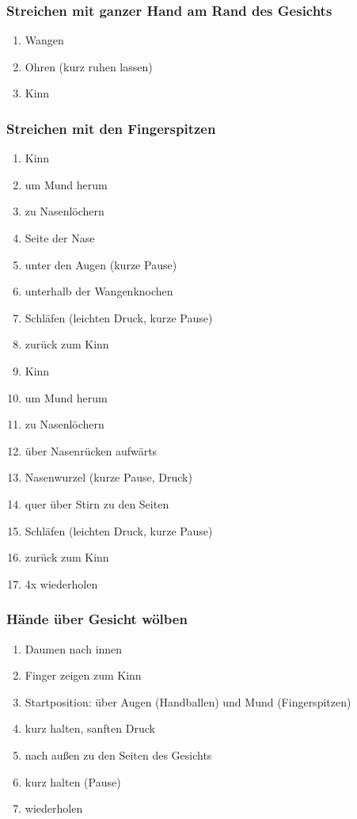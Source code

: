 \subsubsection{Streichen mit ganzer Hand am Rand des Gesichts}
\begin{enumerate}
\item Wangen
\item Ohren (kurz ruhen lassen)
\item Kinn
\end{enumerate}

\subsubsection{Streichen mit den Fingerspitzen}
\begin{enumerate}
\item Kinn
\item um Mund herum
\item zu Nasenlöchern
\item Seite der Nase
\item unter den Augen (kurze Pause)
\item unterhalb der Wangenknochen
\item Schläfen (leichten Druck, kurze Pause)
\item zurück zum Kinn
\item Kinn 
\item um Mund herum 
\item zu Nasenlöchern
\item über Nasenrücken aufwärts
\item Nasenwurzel (kurze Pause, Druck)
\item quer über Stirn zu den Seiten
\item Schläfen (leichten Druck, kurze Pause)
\item zurück zum Kinn
\item 4x wiederholen
\end{enumerate}

\subsubsection{Hände über Gesicht wölben}
\begin{enumerate}
\item Daumen nach innen
\item Finger zeigen zum Kinn
\item Startposition: über Augen (Handballen) und Mund (Fingerspitzen)
\item kurz halten, sanften Druck
\item nach außen zu den Seiten des Gesichts
\item kurz halten (Pause)
\item wiederholen
\end{enumerate}

